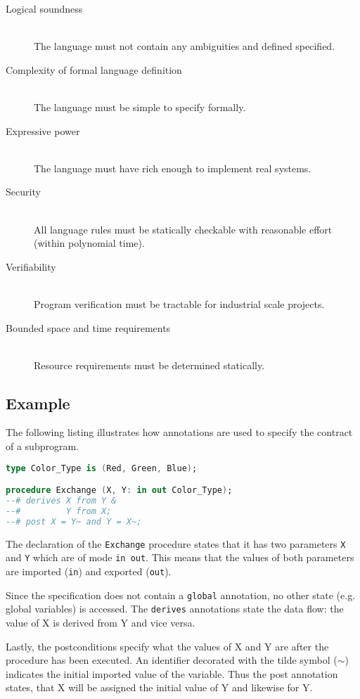 \begin{description}
	\item[Logical soundness] \hfill \\
		The language must not contain any ambiguities and defined specified.
	\item[Complexity of formal language definition] \hfill \\
		The language must be simple to specify formally.
	\item[Expressive power] \hfill \\
		The language must have rich enough to implement real systems.
	\item[Security] \hfill \\
		All language rules must be statically checkable with reasonable effort
		(within polynomial time).
	\item[Verifiability] \hfill \\
		Program verification must be tractable for industrial scale projects.
	\item[Bounded space and time requirements] \hfill \\
		Resource requirements must be determined statically.
\end{description}

\subsection{Example}
The following listing illustrates how annotations are used to specify the
contract of a subprogram.

\begin{lstlisting}[language=Ada]
type Color_Type is (Red, Green, Blue);

procedure Exchange (X, Y: in out Color_Type);
--# derives X from Y &
--#         Y from X;
--# post X = Y~ and Y = X~;
\end{lstlisting}

The declaration of the \texttt{Exchange} procedure states that it has two
parameters \texttt{X} and \texttt{Y} which are of mode \texttt{in out}. This
means that the values of both parameters are imported (\texttt{in}) and exported
(\texttt{out}).

Since the specification does not contain a \texttt{global} annotation, no other
state (e.g. global variables) is accessed. The \texttt{derives} annotations
state the data flow: the value of X is derived from Y and vice versa.

Lastly, the postconditions specify what the values of X and Y are after the
procedure has been executed. An identifier decorated with the tilde symbol
($\sim$) indicates the initial imported value of the variable. Thus the post
annotation states, that X will be assigned the initial value of Y and likewise
for Y.

